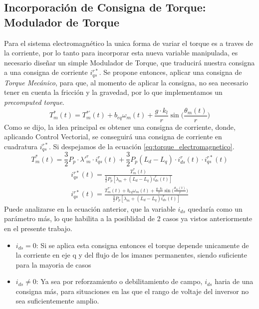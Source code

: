 \documentclass[12pt, a4paper,journal, onecolumn, compsoc]{IEEEtran}
\begin{document}
\subsection{Incorporación de Consigna de Torque: Modulador de Torque}
Para el sistema electromagnético la unica forma de variar el torque es a traves de la corriente, por lo tanto para incorporar esta nueva variable manipulada, es necesario diseñar un simple Modulador de Torque, que traducirá nuestra consigna a una consigna de corriente $i_{qs}^{r*}$. Se propone entonces, aplicar una consigna de \textit{Torque Mecánico}, para que, al momento de aplicar la consigna, no sea necesario tener en cuenta la fricción y la gravedad, por lo que implementamos un \textit{precomputed torque}.
\begin{equation}
    T_m^{\ast}(t) = T_m^{\ast\prime}(t) + b_{eq}\omega_m(t) + \frac{g\cdot k_l}{r}\sin{\Bigg( \frac{\theta_m(t)}{r}\Bigg)}
\end{equation}
Como se dijo, la idea principal es obtener una consigna de corriente, donde, aplicando Control Vectorial, se conseguirá una consigna de corriente en cuadratura $i_{qs}^{r*}$. Si despejamos de la ecuación \eqref{eq:torque_electromagnetico}.
    \begin{equation*}
            T_m^*(t) = \frac{3}{2} P_p \cdot \lambda'^r_m \cdot i^r_{qs}(t) + \frac{3}{2} P_p (L_d-L_q)\cdot i^r_{ds}(t)\cdot i^{r*}_{qs}(t)
    \end{equation*}
\begin{gather*}
i_{qs}^{r*}(t)=
\frac{T_m^*(t)}
{\frac{3}{2}P_p\left[\lambda_m+(L_d-L_q)i_{ds}^{r}(t)\right]} \\
i_{qs}^{r*}(t)= \frac{T_m^{\ast\prime}(t) + b_{eq}\omega_m(t) + \frac{g\cdot k_l}{r}\sin{\Big( \frac{\theta_m(t)}{r}\Big)}}{\frac{3}{2}P_p\left[\lambda_m+(L_d-L_q)i_{ds}^{r}(t)\right]}
\end{gather*}
Puede analizarse en la ecuación anterior, que la variable $i_{ds}$ quedaría como un parámetro más, lo que habilita a la posiblidad de 2 casos ya vistos anteriormente en el presente trabajo.
\begin{itemize}
    \item $i_{ds} = 0$: Si se aplica esta consigna entonces el torque depende unicamente de la corriente en eje q y del flujo de los imanes permanentes, siendo suficiente para la mayoria de casos
    \item $i_{ds} \neq 0$: Ya sea por reforzamiento o debilitamiento de campo, $i_{ds}$ haria de una consigna más, para situaciones en las que el rango de voltaje del inversor no sea suficientemente amplio.
\end{itemize}
\end{document}
